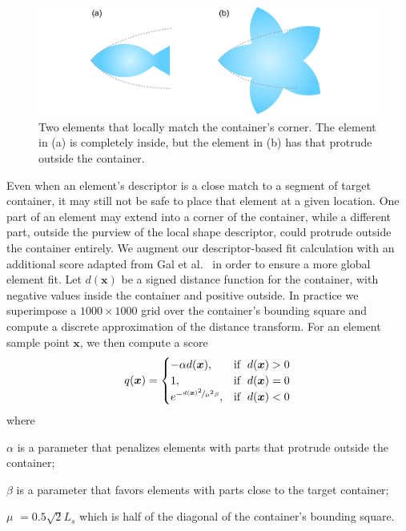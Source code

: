 \begin{figure}%
\centering
\includegraphics[width=1.0\textwidth]{figures/repulsionpak/shape_matching_score.pdf}
\caption[Global and local shape matching]{
  \label{fig_global_local}
  \newtext
  {
  Two elements that locally match the container's corner. 
  The element in (a) is completely inside, but the element in (b) has  that
  protrude outside the container.
  }
}
\end{figure}

Even when an element's descriptor is a close match to a segment of target container, 
it may still not be safe to place that element at a given location.
One part of an element may extend into a corner of the container,
while a different part, outside the purview of the local shape descriptor,
could protrude outside the container entirely.  We augment our 
descriptor-based fit calculation with an additional score adapted from
Gal et al.~\cite{Gal2007B} in order to ensure a more global element fit.
Let $d(\bm{x})$ be a signed distance function for the container, with
negative values inside the container and positive outside.  In practice we
superimpose a $1000\times 1000$ grid over the container's bounding square and
compute a discrete approximation of the distance transform.  For an element
sample point $\bm{x}$, we then compute a score
\begin{equation}
 q(\bm{x}) =\begin{cases}    
    - \alpha d(\bm{x}), & \mathrm{if}\;\; d(\bm{x}) > 0  \\    
    1, & \mathrm{if} \;\;d(\bm{x}) = 0 \\
    e^{-\nicefrac{d(\bm{x})^2}{\mu^2\beta}}, & \mathrm{if} \;\; d(\bm{x}) < 0
  \end{cases}
\end{equation}
where 
\begin{packeddescriptions}
  \item[$\alpha$] is a parameter that penalizes elements with parts that protrude outside the container;
  \item[$\beta$] is a parameter that favors elements with parts close to the target container;
  \item[$\mu$] $= 0.5 \sqrt{2}L_{s}$ which is half of the diagonal of the container's bounding square.
\end{packeddescriptions}  

